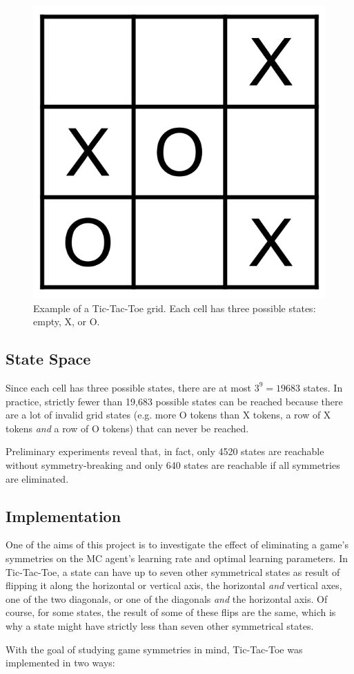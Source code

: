 \documentclass[11pt,a4paper,twoside,openright]{report}
\begin{document}
\begin{figure}[htbp]
	\begin{center}
		\includegraphics[width=0.3\linewidth]{tictactoe_grid_example.png}
		\caption{Example of a Tic-Tac-Toe grid. Each cell has three possible states: empty, X, or O.}
		\label{tic-tac-toe-grid-example}
	\end{center}
\end{figure}


\subsection{State Space}
\label{sec:TicTacToeStateSpace}

Since each cell has three possible states, there are at most $3^9 = 19683$ states. In practice, strictly fewer than 19,683 possible states can be reached because there are a lot of invalid grid states (e.g. more O tokens than X tokens, a row of X tokens \emph{and} a row of O tokens) that can never be reached.

Preliminary experiments reveal that, in fact, only 4520 states are reachable without symmetry-breaking and only 640 states are reachable if all symmetries are eliminated.


\subsection{Implementation}
\label{sec:TicTacToeImplementation}

One of the aims of this project is to investigate the effect of eliminating a game's symmetries on the MC agent's learning rate and optimal learning parameters. In Tic-Tac-Toe, a state can have up to seven other symmetrical states as result of flipping it along the horizontal or vertical axis, the horizontal \emph{and} vertical axes, one of the two diagonals, or one of the diagonals \emph{and} the horizontal axis. Of course, for some states, the result of some of these flips are the same, which is why a state might have strictly less than seven other symmetrical states.

With the goal of studying game symmetries in mind, Tic-Tac-Toe was implemented in two ways:
\end{document}

